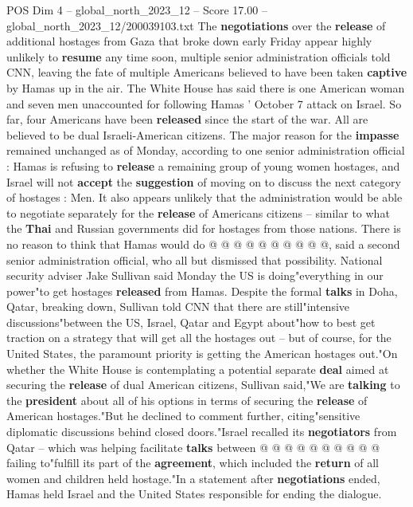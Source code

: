 \begin{textsample}{POS Dim 4 – global\_north\_2023\_12 – Score 17.00 – global\_north\_2023\_12/200039103.txt}  \label{ex:f4_pos_317}
The \textbf{negotiations} over the \textbf{release} of additional hostages from Gaza that broke down early Friday appear highly unlikely to \textbf{resume} any time soon, multiple senior administration officials told CNN, leaving the fate of multiple Americans believed to have been taken \textbf{captive} by Hamas up in the air.
The White House has said there is one American woman and seven men unaccounted for following Hamas ' October 7 attack on Israel.
So far, four Americans have been \textbf{released} since the start of the war.
All are believed to be dual Israeli-American citizens.
The major reason for the \textbf{impasse} remained unchanged as of Monday, according to one senior administration official : Hamas is refusing to \textbf{release} a remaining group of young women hostages, and Israel will not \textbf{accept} the \textbf{suggestion} of moving on to discuss the next category of hostages : Men.
It also appears unlikely that the administration would be able to negotiate separately for the \textbf{release} of Americans citizens -- similar to what the \textbf{Thai} and Russian governments did for hostages from those nations.
There is no reason to think that Hamas would do @ @ @ @ @ @ @ @ @ @, said a second senior administration official, who all but dismissed that possibility.
National security adviser Jake Sullivan said Monday the US is doing"everything in our power"to get hostages \textbf{released} from Hamas.
Despite the formal \textbf{talks} in Doha, Qatar, breaking down, Sullivan told CNN that there are still"intensive discussions"between the US, Israel, Qatar and Egypt about"how to best get traction on a strategy that will get all the hostages out -- but of course, for the United States, the paramount priority is getting the American hostages out."On whether the White House is contemplating a potential separate \textbf{deal} aimed at securing the \textbf{release} of dual American citizens, Sullivan said,"We are \textbf{talking} to the \textbf{president} about all of his options in terms of securing the \textbf{release} of American hostages."But he declined to comment further, citing"sensitive diplomatic discussions behind closed doors."Israel recalled its \textbf{negotiators} from Qatar -- which was helping facilitate \textbf{talks} between @ @ @ @ @ @ @ @ @ @ failing to"fulfill its part of the \textbf{agreement}, which included the \textbf{return} of all women and children held hostage."In a statement after \textbf{negotiations} ended, Hamas held Israel and the United States responsible for ending the dialogue.

\end{textsample}
